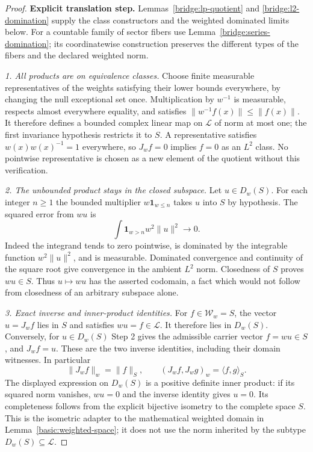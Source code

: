 \documentclass[11pt,a4paper]{article}
\theoremstyle{definition}
\theoremstyle{remark}
\begin{document}
\begin{proof}
\noindent\textbf{Explicit translation step.} Lemmas~\ref{bridge:lp-quotient} and \ref{bridge:l2-domination} supply the
class constructors and the weighted dominated limits below. For a
countable family of sector fibers use Lemma~\ref{bridge:series-domination};
its coordinatewise construction preserves the different types of the
fibers and the declared weighted norm.

\emph{1. All products are on equivalence classes.}
Choose finite measurable representatives of the weights satisfying
their lower bounds everywhere, by changing the null exceptional set
once. Multiplication by $w^{-1}$ is measurable, respects almost
everywhere equality, and satisfies
$\|w^{-1}f(x)\|\leq\|f(x)\|$. It therefore defines a bounded
complex linear map on $\mathcal L$ of norm at most one; the first
invariance hypothesis restricts it to $S$. A representative satisfies
$w(x)w(x)^{-1}=1$ everywhere, so $J_wf=0$ implies $f=0$ as an
$L^2$ class. No pointwise representative is chosen as a new element
of the quotient without this verification.

\emph{2. The unbounded product stays in the closed subspace.}
Let $u\in D_w(S)$. For each integer $n\geq1$ the bounded
multiplier $w\mathbf1_{w\leq n}$ takes $u$ into $S$ by hypothesis.
The squared error from $wu$ is
\[
 \int \mathbf1_{w>n}w^2\|u\|^2\longrightarrow0.
\]
Indeed the integrand tends to zero pointwise, is dominated by the
integrable function $w^2\|u\|^2$, and is measurable. Dominated
convergence and continuity of the square root give convergence in
the ambient $L^2$ norm. Closedness of $S$ proves $wu\in S$.
Thus $u\mapsto wu$ has the asserted codomain, a fact which would
not follow from closedness of an arbitrary subspace alone.

\emph{3. Exact inverse and inner-product identities.}
For $f\in\mathcal W_w=S$, the vector $u=J_wf$ lies in $S$ and
satisfies $wu=f\in\mathcal L$. It therefore lies in $D_w(S)$.
Conversely, for $u\in D_w(S)$ Step 2 gives the admissible carrier
vector $f=wu\in S$, and $J_wf=u$. These are the two inverse
identities, including their domain witnesses. In particular
\[
 \|J_wf\|_w=\|f\|_S,\qquad
 (J_wf,J_wg)_w=\langle f,g\rangle_S.
\]
The displayed expression on $D_w(S)$ is a positive definite
inner product: if its squared norm vanishes, $wu=0$ and the
inverse identity gives $u=0$. Its completeness follows from the
explicit bijective isometry to the complete space $S$. This is the
isometric adapter to the mathematical weighted domain in
Lemma~\ref{basic:weighted-space}; it does not use the norm inherited
by the subtype $D_w(S)\subseteq\mathcal L$.


\end{proof}
\end{document}
